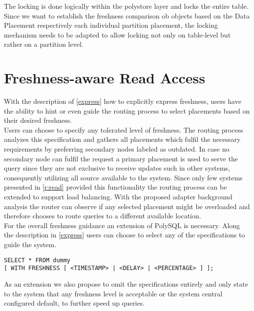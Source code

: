
The locking is done logically within the polystore layer and locks the entire table.
Since we want to establish the freshness comparison ob objects based on the Data Placement respectively each individual partition placement, the locking mechanism
needs to be adapted to allow locking not only on table-level but rather on a partition level. 


\section{Freshness-aware Read Access}


With the description of \ref{express} how to explicitly express freshness, users have the ability to hint or even guide the routing process to select placements 
based on their desired freshness.\\
Users can choose to specify any tolerated level of freshness. The routing process analyzes this specification and gathers all placements which fulfil the necessary 
requirements by preferring secondary nodes labeled as outdated.
In case no secondary node can fulfil the request a primary placement is used to serve the query since they are not exclusive to receive updates such in other systems,
consequently utilizing all source available to the system.
Since only few systems presented in \ref{r:read} provided this functionality the routing process can be extended to support load balancing. 
With the proposed adapter background analysis the router can observe if any selected placement might be overloaded and therefore chooses to route 
queries to a different available location. \\



For the overall freshness guidance an extension of PolySQL is necessary.
Along the description in \ref{express} users can choose to select any of the specifications to guide the system.
\begin{verbatim}
SELECT * FROM dummy 
[ WITH FRESHNESS [ <TIMESTAMP> | <DELAY> | <PERCENTAGE> ] ];
\end{verbatim}
As an extension we also propose to omit the specifications entirely and only state to the system that any freshness level is acceptable or the system central
configured default, to further speed up queries.



